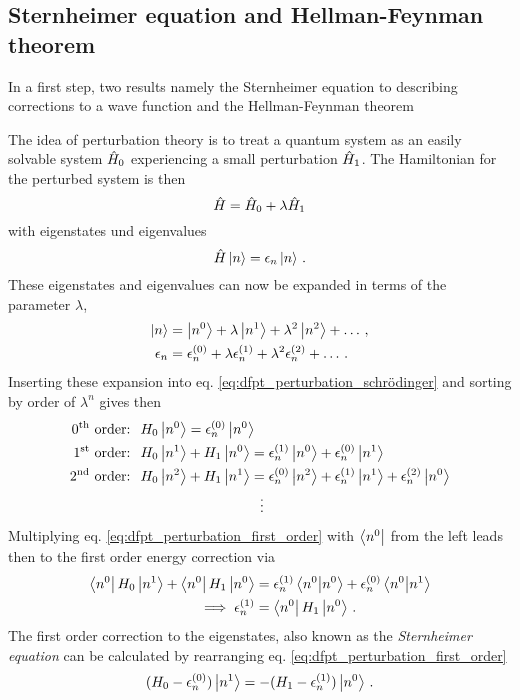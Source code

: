 \documentclass[main.tex]{subfiles}
\begin{document}
\subsection{Sternheimer equation and Hellman-Feynman theorem}

In a first step, two results  namely the Sternheimer equation to describing corrections to a wave function  and the Hellman-Feynman theorem 

The idea of perturbation theory is to treat a quantum system as an easily solvable system \(\hat{H}_0\) experiencing a small perturbation \(\hat{H}_1\).
The Hamiltonian for the perturbed system is then
\begin{equation}
    \hat{H} = \hat{H}_0 + \lambda \hat{H}_1
\end{equation}
with eigenstates und eigenvalues
\begin{equation}\label{eq:dfpt_perturbation_schrödinger}
    \hat{H} \ket{n} = \epsilon_n \ket{n}\,.
\end{equation}
These eigenstates and eigenvalues can now be expanded in terms of the parameter \(\lambda\),
\begin{align}
    \ket{n} &= \ket{n^{0}} + \lambda \ket{n^{1}} + \lambda^2 \ket{n^{2}} + \ldots\,, \\
    \epsilon_n &= \epsilon_n^{(0)} + \lambda \epsilon_n^{(1)} + \lambda^2 \epsilon_n^{(2)} + \ldots\,.
\end{align}
Inserting these expansion into eq. \ref{eq:dfpt_perturbation_schrödinger} and sorting by order of \(\lambda^n\) gives then
\begin{align}
    \text{0\textsuperscript{th} order: }\; &H_0 \ket{n^{0}} = \epsilon_n^{(0)} \ket{n^{0}} \\ 
    \text{1\textsuperscript{st} order: }\; &H_0 \ket{n^{1}} + H_1 \ket{n^{0}} = \epsilon_n^{(1)} \ket{n^{0}} + \epsilon_n^{(0)} \ket{n^{1}} \label{eq:dfpt_perturbation_first_order} \\
    \text{2\textsuperscript{nd} order: }\; &H_0 \ket{n^{2}} + H_1 \ket{n^{1}} = \epsilon_n^{(0)} \ket{n^{2}} + \epsilon_n^{(1)} \ket{n^{1}} + \epsilon_n^{(2)} \ket{n^{0}} \\
    &\hspace{3cm} \vdots \nonumber
\end{align}
Multiplying eq. \ref{eq:dfpt_perturbation_first_order} with \(\bra{n^{0}}\) from the left leads then to the first order energy correction via
\begin{align}
    \bra{n^{0}} H_0 \ket{n^{1}} + \bra{n^{0}} H_1 \ket{n^{0}} &= \epsilon_n^{(1)} \bra{n^{0}} \ket{n^{0}} + \epsilon_n^{(0)} \bra{n^{0}} \ket{n^{1}} \\
    \implies \epsilon_n^{(1)} &= \bra{n^{0}} H_1 \ket{n^{0}}\,.
\end{align}
The first order correction to the eigenstates, also known as the \emph{Sternheimer equation} can be calculated by rearranging eq. \ref{eq:dfpt_perturbation_first_order}
\begin{equation}\label{eq:dfpt_sternheimer}
    (H_0 - \epsilon_n^{(0)}) \ket{n^1} = -(H_1 - \epsilon_n^{(1)}) \ket{n^0}\,.
\end{equation}
\end{document}
